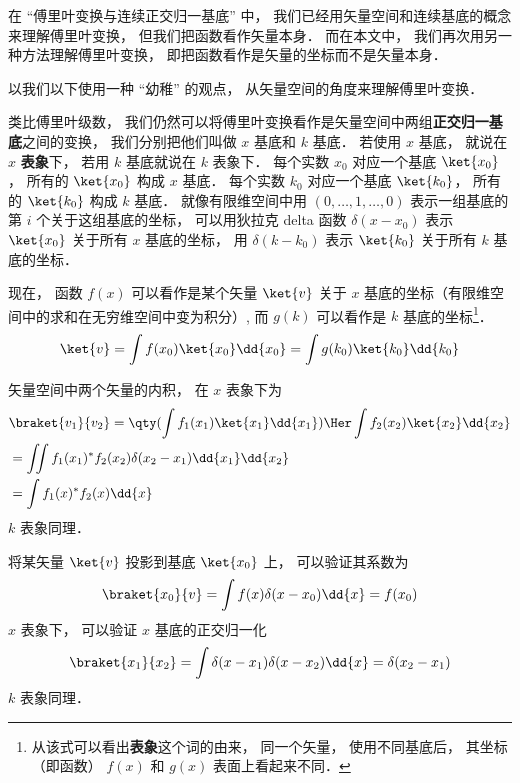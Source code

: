 

在 “傅里叶变换与连续正交归一基底” 中， 我们已经用矢量空间和连续基底的概念来理解傅里叶变换， 但我们把函数看作矢量本身． 而在本文中， 我们再次用另一种方法理解傅里叶变换， 即把函数看作是矢量的坐标而不是矢量本身．

以我们以下使用一种 “幼稚” 的观点， 从矢量空间的角度来理解傅里叶变换．

类比傅里叶级数， 我们仍然可以将傅里叶变换看作是矢量空间中两组\textbf{正交归一基底}之间的变换， 我们分别把他们叫做 $x$ 基底和 $k$ 基底． 若使用 $x$ 基底， 就说在 $x$ \textbf{表象}下， 若用 $k$ 基底就说在 $k$ 表象下． 每个实数 $x_0$ 对应一个基底 $\ket {x_0}$， 所有的 $\ket{x_0}$ 构成 $x$ 基底． 每个实数 $k_0$ 对应一个基底 $\ket {k_0}$， 所有的 $\ket {k_0}$ 构成 $k$ 基底． 就像有限维空间中用 $(0, \dots , 1, \dots , 0)$ 表示一组基底的第 $i$ 个关于这组基底的坐标， 可以用狄拉克 delta 函数 $\delta (x - x_0)$ 表示 $\ket {x_0}$ 关于所有 $x$ 基底的坐标， 用 $\delta (k - k_0)$ 表示 $\ket {k_0}$ 关于所有 $k$ 基底的坐标．

现在， 函数 $f(x)$ 可以看作是某个矢量 $\ket{v}$ 关于 $x$ 基底的坐标（有限维空间中的求和在无穷维空间中变为积分）, 而 $g(k)$ 可以看作是 $k$ 基底的坐标\footnote{从该式可以看出\textbf{表象}这个词的由来， 同一个矢量， 使用不同基底后， 其坐标（即函数） $f(x)$ 和 $g(x)$ 表面上看起来不同．}．
\begin{equation}
\ket{v} = \int f(x_0) \ket {x_0} \dd{x_0} = \int g(k_0) \ket {k_0} \dd{k_0}
\end{equation}

矢量空间中两个矢量的内积， 在 $x$ 表象下为
\begin{equation}
\begin{aligned}
&\braket{v_1}{v_2} = \qty(\int f_1(x_1) \ket{x_1} \dd{x_1})\Her  \int f_2(x_2) \ket{x_2} \dd{x_2}\\
&=\iint f_1(x_1)^* f_2(x_2) \delta (x_2 - x_1) \dd{x_1}\dd{x_2}\\
&=\int f_1(x)^* f_2(x) \dd{x}
\end{aligned}
\end{equation}
$k$ 表象同理．

将某矢量 $\ket{v}$ 投影到基底 $\ket{x_0}$ 上， 可以验证其系数为
\begin{equation}
\braket{x_0}{v} = \int f(x) \delta (x - x_0) \dd{x} = f(x_0)
\end{equation}
$x$ 表象下， 可以验证 $x$ 基底的正交归一化%
\begin{equation}
\braket{x_1}{x_2} = \int \delta (x - x_1) \delta (x - x_2) \dd{x} = \delta (x_2 - x_1)
\end{equation}
$k$ 表象同理．

